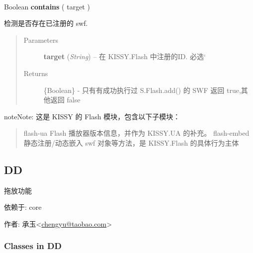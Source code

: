 \documentclass[letterpaper,10pt,english]{sphinxmanual}
\begin{document}

\begin{fulllineitems}
\label{api/component/flash/flash-embed:flash.contains}~
\begin{DUlineblock}{0em}
\item[] Boolean \textbf{contains} ( target )
\item[] 检测是否存在已注册的 swf.
\end{DUlineblock}
\begin{quote}\begin{description}
\item[{Parameters}] \leavevmode
\textbf{target} (\emph{String}) -- 在 KISSY.Flash 中注册的ID.  必选{}`

\item[{Returns}] \leavevmode
\{Boolean\} - 只有有成功执行过 S.Flash.add() 的 SWF 返回 true,其他返回 false

\end{description}\end{quote}

\end{fulllineitems}


\begin{notice}{note}{Note:}
这是 KISSY 的 Flash 模块，包含以下子模块：
\begin{quote}

flash-ua Flash 播放器版本信息，并作为 KISSY.UA 的补充。
flash-embed 静态注册/动态嵌入 swf 对象等方法，是 KISSY.Flash 的具体行为主体
\end{quote}
\end{notice}


\subsection{DD}
\label{api/component/dd/index:dd}\label{api/component/dd/index:ddindex}\label{api/component/dd/index::doc}
\begin{DUlineblock}{0em}
\item[] 拖放功能
\item[] 依赖于: core
\item[] 作者: 承玉\textless{}\href{mailto:chengyu@taobao.com}{chengyu@taobao.com}\textgreater{}
\end{DUlineblock}


\subsubsection{Classes in DD}
\label{api/component/dd/index:classes-in-dd}\label{api/component/dd/draggable:module-Draggable}
\end{document}

